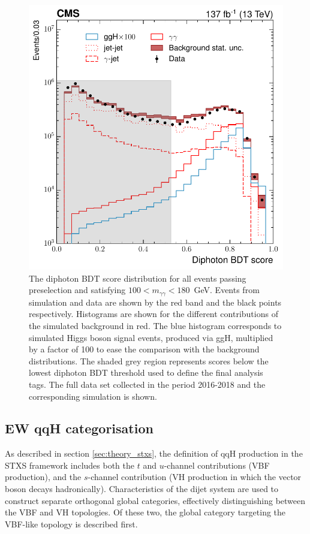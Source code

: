 \begin{figure}[htb!]
  \centering
  \includegraphics[width=.5\textwidth]{Figures/hgg_overview/DiphoBDT_dipho_mva_logPlot_noStack.pdf}
  \caption[Diphoton BDT output distribution]
  {
    The diphoton BDT score distribution for all events passing preselection and satisfying $100<m_{\gamma\gamma}<180$~GeV. Events from simulation and data are shown by the red band and the black points respectively. Histograms are shown for the different contributions of the simulated background in red. The blue histogram corresponds to simulated Higgs boson signal events, produced via ggH, multiplied by a factor of 100 to ease the comparison with the background distributions. The shaded grey region represents scores below the lowest diphoton BDT threshold used to define the final analysis tags. The full data set collected in the period 2016-2018 and the corresponding simulation is shown.
  }
  \label{fig:diphoton_score}
\end{figure}



\FloatBarrier

\subsection{EW qqH categorisation}\label{sec:qqH_categorisation}
As described in section \ref{sec:theory_stxs}, the definition of qqH production in the STXS framework includes both the $t$ and $u$-channel contributions (VBF production), and the $s$-channel contribution (VH production in which the vector boson decays hadronically). Characteristics of the dijet system are used to construct separate orthogonal global categories, effectively distinguishing between the VBF and VH topologies. Of these two, the global category targeting the VBF-like topology is described first. 

